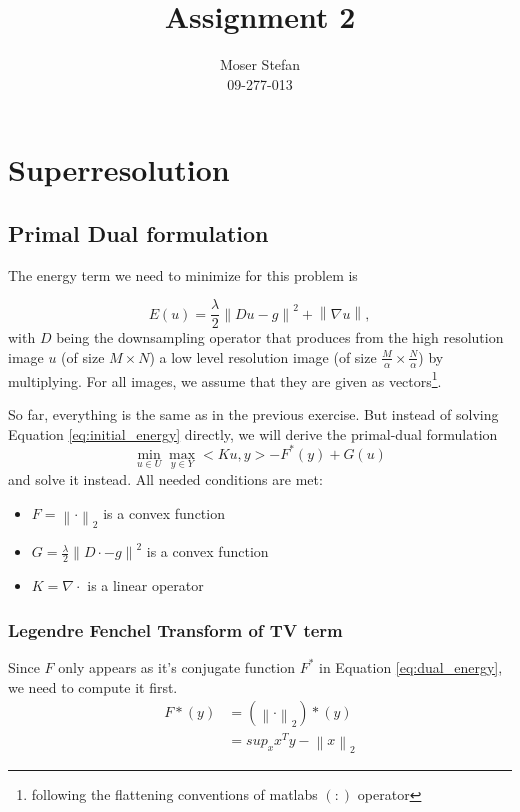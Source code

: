 \documentclass{paper}
\title{Assignment 2}
\author{Moser Stefan\\09-277-013}
\newcommand{\norm}[1]{\left\lVert#1\right\rVert}
\begin{document}
\maketitle


%

\section*{Superresolution}

\subsection*{Primal Dual formulation}
The energy term we need to minimize for this problem is

\begin{equation}
E(u) = \frac{\lambda}{2} \norm{Du - g}^2 + \norm{\nabla u} ,
\label{eq:initial_energy}
\end{equation}
with $D$ being the downsampling operator that produces from the high 
resolution image $u$ (of size $M \times N$) a low level resolution image
(of size $\frac{M}{\alpha} \times \frac{N}{\alpha}$) by multiplying. 
For all images, we assume that they are given as vectors\footnote{following the flattening conventions of matlabs $(:)$ operator}.

So far, everything is the same as in the previous exercise. But instead of
solving Equation \ref{eq:initial_energy} directly, we will derive the primal-dual
formulation
\begin{equation}
\min_{u \in U} \max_{y \in Y} < Ku, y > - F^*(y) + G(u)
\end{equation}
and solve it instead. All needed conditions are met:
\label{eq:dual_energy}
\begin{itemize}
\item $F = \norm{\cdot}_2$ is a convex function
\item $G = \frac{\lambda}{2}\norm{ D\cdot - g}^2$ is a convex function
\item $K = \nabla \cdot$ is a linear operator
\end{itemize}
\subsubsection{Legendre Fenchel Transform of TV term}
Since $F$ only appears as it's conjugate function $F^*$ in Equation \ref{eq:dual_energy}, we need to compute it first.
\begin{align}
	F*(y) &= (\norm{\cdot}_2)*(y) \\
		  &= sup_x x^T y - \norm{x}_2
\end{align}
\end{document}
